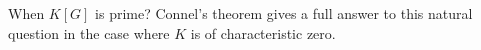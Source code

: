 %
%
%
%
%
%
%
%	


When $K[G]$ is prime? Connel's theorem gives a full answer to this natural
question in the case where $K$ is of characteristic zero. 

